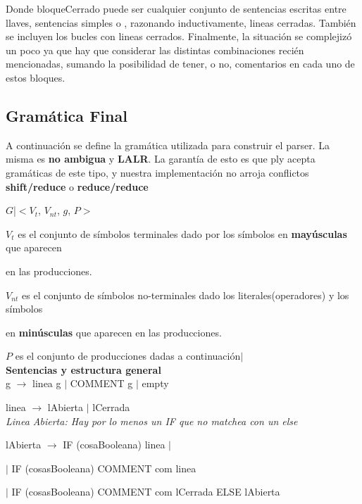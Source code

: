 Donde bloqueCerrado puede ser cualquier conjunto de sentencias escritas entre llaves, sentencias simples o , razonando inductivamente, lineas cerradas. También se incluyen los bucles con lineas cerrados. Finalmente, la situación se complejizó un poco ya que hay que considerar las distintas combinaciones recién mencionadas, sumando la posibilidad de tener, o no, comentarios en cada uno de estos bloques.


\subsection{Gramática Final}
A continuación se define la gramática utilizada para construir el parser. La misma es \textbf{no ambigua} y \textbf{LALR}. La garantía de esto es que ply acepta gramáticas de este tipo, y nuestra implementación no arroja conflictos \textbf{shift/reduce} o \textbf{reduce/reduce} \\

\linespread{1.125}\selectfont

$G$|$<V_{t}$, $V_{nt}$, $g$, $P>$

$V_{t}$ es el conjunto de símbolos terminales dado por los símbolos en \textbf{mayúsculas} que aparecen 

en las producciones.


$V_{nt}$ es el conjunto de símbolos no-terminales dado los literales(operadores) y los símbolos

en \textbf{minúsculas} que aparecen en las producciones.



$P$ es el conjunto de producciones dadas a continuación$|$\\


\textbf{Sentencias y estructura general} \\

g $\rightarrow$ linea g $|$ COMMENT g $|$ empty 

linea $\rightarrow$ lAbierta $|$ lCerrada \\


\textit{Linea Abierta: Hay por lo menos un IF que no matchea con un else} 

lAbierta $\rightarrow$ IF (cosaBooleana) linea $|$

\hspace{15mm}$|$ IF (cosasBooleana) COMMENT com linea 

\hspace{15mm}$|$ IF (cosasBooleana) COMMENT com lCerrada ELSE lAbierta 

